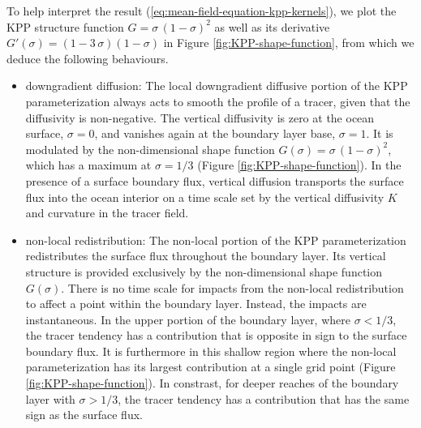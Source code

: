 To help interpret the result
(\ref{eq:mean-field-equation-kpp-kernels}), we plot the KPP structure
function $G = \sigma \, (1-\sigma)^{2}$ as well as its derivative
$G'(\sigma) = (1-3\, \sigma)(1-\sigma)$ in Figure
\ref{fig:KPP-shape-function}, from which we deduce the following
behaviours.
\begin{itemize}

\item {\sc downgradient diffusion}: The local downgradient diffusive
  portion of the KPP parameterization always acts to smooth the
  profile of a tracer, given that the diffusivity is non-negative.
  The vertical diffusivity is zero at the ocean surface, $\sigma=0$,
  and vanishes again at the boundary layer base, $\sigma=1$.  It is
  modulated by the non-dimensional shape function $G(\sigma) = \sigma
  \, (1-\sigma)^{2}$, which has a maximum at $\sigma=1/3$ (Figure
  \ref{fig:KPP-shape-function}).  In the presence of a surface
  boundary flux, vertical diffusion transports the surface flux into
  the ocean interior on a time scale set by the vertical diffusivity
  $K$ and curvature in the tracer field.

\item {\sc non-local redistribution}: The non-local portion of the KPP
  parameterization redistributes the surface flux throughout the
  boundary layer.  Its vertical structure is provided exclusively by
  the non-dimensional shape function $G(\sigma)$.  There is no
  time scale for impacts from the non-local redistribution to affect a
  point within the boundary layer. Instead, the impacts are
  instantaneous.  In the upper portion of the boundary layer, where
  $\sigma < 1/3$, the tracer tendency has a contribution that is
  opposite in sign to the surface boundary flux.  It is furthermore in
  this shallow region where the non-local parameterization has its
  largest contribution at a single grid point (Figure
  \ref{fig:KPP-shape-function}).  In constrast, for deeper reaches
  of the boundary layer with $\sigma > 1/3$, the tracer tendency has a
  contribution that has the same sign as the surface flux.

\end{itemize}




